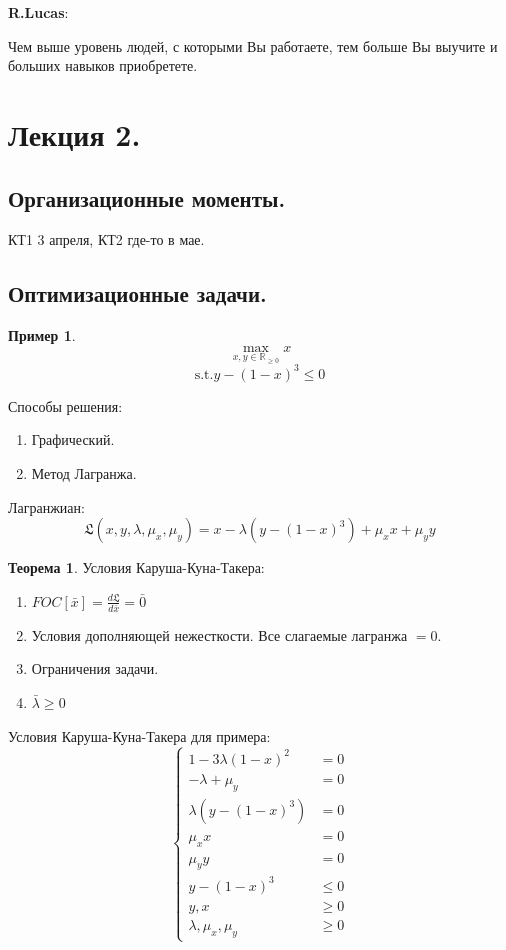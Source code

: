 \documentclass[reqno]{article}
\theoremstyle{definition}
\theoremstyle{definition}
\theoremstyle{definition}
\newtheorem*{exmp}{Пример}
\theoremstyle{definition}
\theoremstyle{definition}
\theoremstyle{definition}
\newtheorem{thm}{Теорема}[section]
\theoremstyle{definition}
\theoremstyle{definition}
\theoremstyle{definition}
\begin{document}
	\textbf{R.Lucas}: 
	
	Чем выше уровень людей, с которыми Вы работаете, тем больше Вы выучите и больших навыков приобретете.
	
	
	\newpage
	
	\section{Лекция 2.}
	
	\subsection{Организационные моменты.}
	
	КТ1 3 апреля, КТ2 где-то в мае.
	
	\subsection{Оптимизационные задачи.}
	
	\begin{exmp}
		$$\max_{x,y \in\mathds{R}_{\geq 0}} x$$
		$$\text{s.t.} y - (1 - x)^3 \leq 0$$
	\end{exmp}
	
	Способы решения:
	\begin{enumerate}
		\item Графический.
		\item Метод Лагранжа.
	\end{enumerate}
	
	Лагранжиан:
	$$\mathfrak{L}(x, y, \lambda, \mu_x, \mu_y) = x - \lambda(y - (1 - x)^3) + \mu_xx + \mu_yy$$
	
	\begin{thm}
		Условия Каруша-Куна-Такера:
		\begin{enumerate}
			\item $FOC[\bar{x}] = \frac{d\mathfrak{L}}{d\bar{x}} = \bar{0}$
			\item Условия дополняющей нежесткости. Все слагаемые лагранжа $= 0$.
			\item Ограничения задачи.
			\item $\bar{\lambda} \geq 0$
		\end{enumerate}
	\end{thm}
	
	Условия Каруша-Куна-Такера для примера:
	\begin{equation}
		\begin{cases}
			1 - 3\lambda(1 - x)^2 & = 0\\
			-\lambda + \mu_y& = 0\\
			\lambda(y - (1 - x)^3)& = 0\\
			\mu_xx & = 0\\
			\mu_yy & = 0\\
			y - (1-x)^3 &\leq 0\\
			y, x &\geq 0\\
			\lambda, \mu_x, \mu_y &\geq 0
		\end{cases}
	\end{equation}
	
\end{document}
